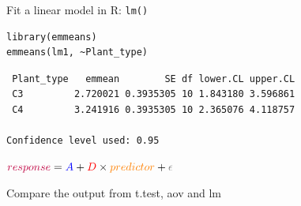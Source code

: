\documentclass{beamer}
\makeatletter
\newenvironment{kframe}{%
 \def\at@end@of@kframe{}%
 \ifinner\ifhmode%
  \def\at@end@of@kframe{\end{minipage}}%
  \begin{minipage}{\columnwidth}%
 \fi\fi%
 \def\FrameCommand##1{\hskip\@totalleftmargin \hskip-\fboxsep
 \colorbox{shadecolor}{##1}\hskip-\fboxsep
     \hskip-\linewidth \hskip-\@totalleftmargin \hskip\columnwidth}%
 \MakeFramed {\advance\hsize-\width
   \@totalleftmargin\z@ \linewidth\hsize
   \@setminipage}}%
 {\par\unskip\endMakeFramed%
 \at@end@of@kframe}
\newenvironment{knitrout}{}{} %
\makeatother
\begin{document}
\begin{frame}[fragile]{Fit a linear model in R: \texttt{lm()}}

\begin{knitrout}
\color{fgcolor}\begin{kframe}
\begin{verbatim}
library(emmeans)
emmeans(lm1, ~Plant_type)
\end{verbatim}
\end{kframe}
\end{knitrout}


\begin{knitrout}
\color{fgcolor}\begin{kframe}
\footnotesize
\begin{verbatim}
 Plant_type   emmean        SE df lower.CL upper.CL
 C3         2.720021 0.3935305 10 1.843180 3.596861
 C4         3.241916 0.3935305 10 2.365076 4.118757

Confidence level used: 0.95 
\end{verbatim}
\end{kframe}
\end{knitrout}

\pause
 ${\color{purple}{response}} = {\color{blue}{A}} + {\color{red}{D}} \times {\color{orange}{predictor}} + {\color{gray}{\epsilon}}$

\end{frame}

\begin{frame}{Compare the output from t.test, aov and lm}
 
\end{frame}
\end{document}
